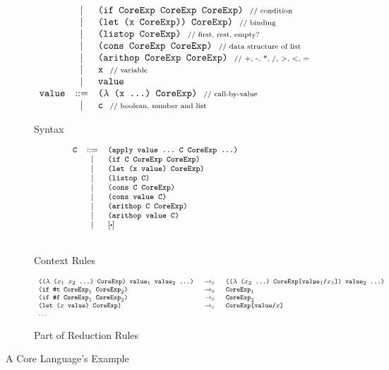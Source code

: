 \begin{figure*}[thb]
\begin{subfigure}{0.55\linewidth}
\[{\begin{array}{lcl}
		&|& \mbox{\tt (if~CoreExp~CoreExp~CoreExp)} ~~\mbox{{\scriptsize // condition}}\\
		&|& \mbox{\tt (let~(x~CoreExp))~CoreExp)} ~~\mbox{{\scriptsize // binding}}\\
		&|& \mbox{\tt (listop~CoreExp)} ~~\mbox{{\scriptsize // first, rest, empty?}}\\
		&|& \mbox{\tt (cons~CoreExp~CoreExp)} ~~\mbox{{\scriptsize // data structure of list}}\\
		&|& \mbox{\tt (arithop~CoreExp~CoreExp)} ~~\mbox{{\scriptsize // +, -, *, /, >, <, =}}\\
		&|& \mbox{\tt x} ~~\mbox{{\scriptsize // variable}}\\
		&|& \mbox{\tt value}\\
		\mbox{\tt value} &::=& \mbox{\tt ($\lambda$~(x~...)~CoreExp)} ~~\mbox{{\scriptsize // call-by-value}}\\
		&|& \mbox{\tt c} ~~\mbox{{\scriptsize // boolean, number and list}}
		\end{array}
}
\]
\caption{Syntax}
\end{subfigure}
\begin{subfigure}{0.4\linewidth}
\[
{\footnotesize
		\begin{array}{lcl}
		\Code{C} &::=& \Code{(apply~value~...~C~CoreExp~...)}\\
		&|& \Code{(if~C~CoreExp~CoreExp)}\\
		&|& \Code{(let~(x~value)~CoreExp)}\\
		&|& \Code{(listop~C)}\\
		&|& \Code{(cons~C~CoreExp)}\\
		&|& \Code{(cons~value~C)}\\
		&|& \Code{(arithop~C~CoreExp)}\\
		&|& \Code{(arithop~value~C)}\\
		&|& [\bigcdot]\\[1.5em]
		\end{array}
}
\]
\caption{Context Rules}
\end{subfigure}

\begin{subfigure}{0.99\linewidth}
	\[
{\footnotesize
		\begin{array}{lcl}
		\texttt{(($\lambda$~($x_1$~$x_2$~...)~CoreExp)~$\mbox{\tt value}_1$~$\mbox{\tt value}_2$~...)} &~\rightarrow_c~& \texttt{(($\lambda$~($x_2$~...)~CoreExp[$\mbox{\tt value}_1$/$x_1$])~$\mbox{\tt value}_2$~...)}\\

		\texttt{(if~$\mbox{\tt \#t}$~$\mbox{\tt CoreExp}_1$~$\mbox{\tt CoreExp}_2$)}&~\rightarrow_c~& \texttt{$\mbox{\tt CoreExp}_1$}\\
		\texttt{(if~$\mbox{\tt \#f}$~$\mbox{\tt CoreExp}_1$~$\mbox{\tt CoreExp}_2$)}&~\rightarrow_c~& \texttt{$\mbox{\tt CoreExp}_2$}\\
		\texttt{(let~($x$~$\mbox{\tt value}$)~CoreExp)}&~\rightarrow_c~&\texttt{CoreExp[\mbox{\tt value}/$x$]}\\
		\ldots&&
		\end{array}
}
\]
	\caption{Part of Reduction Rules}
\end{subfigure}

\caption{A Core Language's Example}
\label{fig:core}
\end{figure*}



